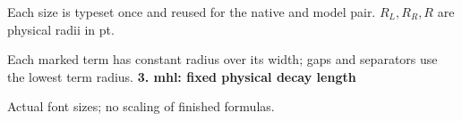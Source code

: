 \documentclass{article}
\newcommand\High{\frac{\displaystyle\sum_{k=1}^n x_k}{1+\frac pq}}
\newcommand\Medium{\frac{x^2+y^2}{z}}
\newcommand\Mark[1]{\directlua{grid.mark(#1)}}
\begin{document}
\par\medskip
Each size is typeset once and reused for the native and model pair. $R_L,R_R,R$ are physical radii in pt.\par
Each marked term has constant radius over its width; gaps and separators use the lowest term radius.
\newpage
{\Large\bfseries 3. mhl: fixed physical decay length}\par\medskip
{} Actual font sizes; no scaling of finished formulas.\par\medskip
\end{document}
